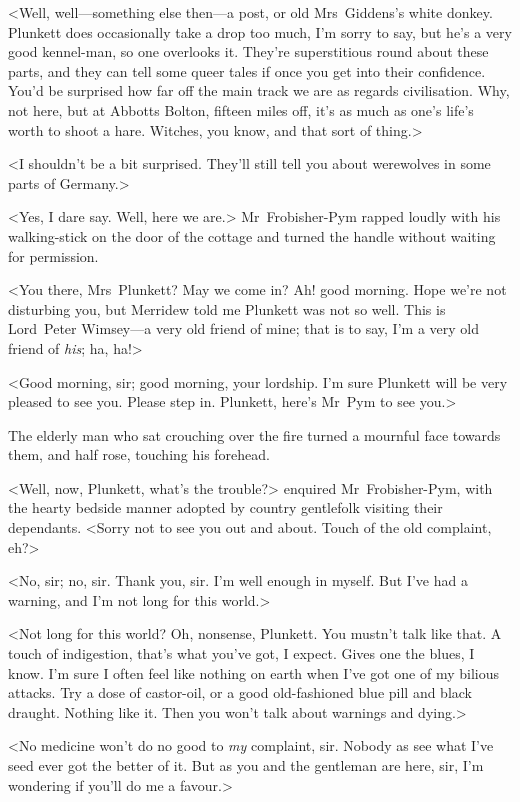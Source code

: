 <Well, well—something else then—a post, or old Mrs~Giddens's white donkey. Plunkett does occasionally take a drop too much, I'm sorry to say, but he's a very good kennel-man, so one overlooks it. They're superstitious round about these parts, and they can tell some queer tales if once you get into their confidence. You'd be surprised how far off the main track we are as regards civilisation. Why, not here, but at Abbotts Bolton, fifteen miles off, it's as much as one's life's worth to shoot a hare. Witches, you know, and that sort of thing.>

<I shouldn't be a bit surprised. They'll still tell you about werewolves in some parts of Germany.>

<Yes, I dare say. Well, here we are.> Mr~Frobisher-Pym rapped loudly with his walking-stick on the door of the cottage and turned the handle without waiting for permission.

<You there, Mrs~Plunkett? May we come in? Ah! good morning. Hope we're not disturbing you, but Merridew told me Plunkett was not so well. This is Lord~Peter Wimsey—a very old friend of mine; that is to say, I'm a very old friend of \textit{his}; ha, ha!>

<Good morning, sir; good morning, your lordship. I'm sure Plunkett will be very pleased to see you. Please step in. Plunkett, here's Mr~Pym to see you.>

The elderly man who sat crouching over the fire turned a mournful face towards them, and half rose, touching his forehead.

<Well, now, Plunkett, what's the trouble?> enquired Mr~Frobisher-Pym, with the hearty bedside manner adopted by country gentlefolk visiting their dependants. <Sorry not to see you out and about. Touch of the old complaint, eh?>

<No, sir; no, sir. Thank you, sir. I'm well enough in myself. But I've had a warning, and I'm not long for this world.>

<Not long for this world? Oh, nonsense, Plunkett. You mustn't talk like that. A touch of indigestion, that's what you've got, I expect. Gives one the blues, I know. I'm sure I often feel like nothing on earth when I've got one of my bilious attacks. Try a dose of castor-oil, or a good old-fashioned blue pill and black draught. Nothing like it. Then you won't talk about warnings and dying.>

<No medicine won't do no good to \textit{my} complaint, sir. Nobody as see what I've seed ever got the better of it. But as you and the gentleman are here, sir, I'm wondering if you'll do me a favour.>

